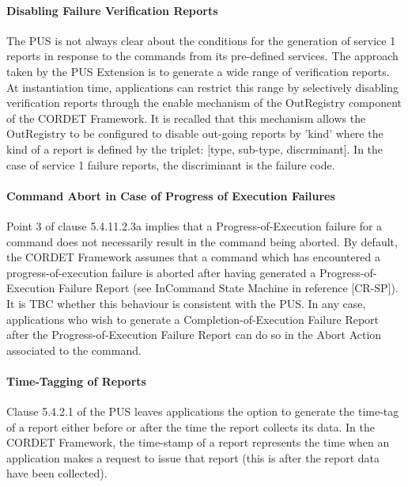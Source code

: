 \documentclass[a4paper,10pt]{article}
\begin{document}
\paragraph{Disabling Failure Verification Reports} 
The PUS is not always clear about the conditions for the generation of service 1 reports in response to the commands from its pre-defined services. The approach taken by the PUS Extension is to generate a wide range of verification reports. At instantiation time, applications can restrict this range by selectively disabling verification reports through the enable mechanism of the OutRegistry component of the CORDET Framework. It is recalled that this mechanism allows the OutRegistry to be configured to disable out-going reports by 'kind' where the kind of a report is defined by the triplet: [type, sub-type, discrminant]. In the case of service 1 failure reports, the discriminant is the failure code. 
 
\paragraph{Command Abort in Case of Progress of Execution Failures}
Point 3 of clause 5.4.11.2.3a implies that a Progress-of-Execution failure for a command does not necessarily result in the command being aborted. By default, the CORDET Framework assumes that a command which has encountered a progress-of-execution failure is aborted after having generated a Progress-of-Execution Failure Report (see InCommand State Machine in reference [CR-SP]). It is TBC whether this behaviour is consistent with the PUS. In any case, applications who wish to generate a Completion-of-Execution Failure Report after the Progress-of-Execution Failure Report can do so in the Abort Action associated to the command.

\paragraph{Time-Tagging of Reports}
Clause 5.4.2.1 of the PUS leaves applications the option to generate the time-tag of a report either before or after the time the report collects its data. In the CORDET Framework, the time-stamp of a report represents the time when an application makes a request to issue that report (this is after the report data have been collected). 
\end{document}
